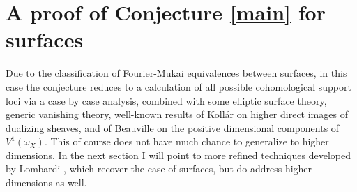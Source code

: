 \documentclass{amsart}
\theoremstyle{plain}
\theoremstyle{definition}
\numberwithin{equation}{section}
\begin{document}
\section{A proof of Conjecture \ref{main} for surfaces}

Due to the classification of Fourier-Mukai equivalences between surfaces, in this case the conjecture reduces to a calculation of all possible cohomological support loci via a case by case analysis, combined with some elliptic surface theory, generic vanishing theory, well-known results of Koll\'ar on higher direct images of dualizing sheaves, and of Beauville on the positive dimensional components of $V^1 (\omega_X)$. This of course does not have much chance to generalize to higher dimensions. In the next section I will point to more refined techniques developed by Lombardi \cite{lombardi}, which recover the case of surfaces, but do address higher 
dimensions as well.
\end{document}
